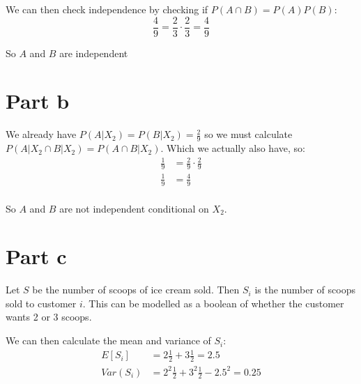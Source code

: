 We can then check independence by checking if $P(A \cap B) = P(A)P(B)$:
\[
	\frac{4}{9} = \frac{2}{3} \cdot \frac{2}{3} = \frac{4}{9}
\]

So $A$ and $B$ are independent

\section{Part b}

We already have $P(A|X_2) = P(B|X_2) = \frac{2}{9}$ so we must calculate $P(A|X_2 \cap B|X_2) = P(A\cap B|X_2)$. Which we actually also have, so:
\begin{align*}
	\frac{1}{9} & = \frac{2}{9} \cdot \frac{2}{9} \\
	\frac{1}{9} & = \frac{4}{9}                   \\
\end{align*}

So $A$ and $B$ are not independent conditional on $X_2$.

\section{Part c}

Let $S$ be the number of scoops of ice cream sold. Then $S_i$ is the number of scoops sold to customer $i$. This can be modelled as a boolean of whether the customer wants 2 or 3 scoops.

We can then calculate the mean and variance of $S_i$:
\begin{align*}
	E[S_i]   & = 2\frac{1}{2} + 3\frac{1}{2} = 2.5              \\
	Var(S_i) & = 2^2\frac{1}{2} + 3^2\frac{1}{2} - 2.5^2 = 0.25
\end{align*}


